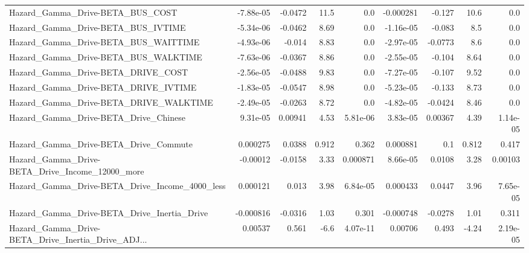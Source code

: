 \begin{tabular}{lrrrrrrrr}
Hazard\_Gamma\_Drive-BETA\_BUS\_COST                   &   -7.88e-05 &      -0.0472 &     11.5 &      0.0 &  -0.000281 &      -0.127 &         10.6 &           0.0 \\
Hazard\_Gamma\_Drive-BETA\_BUS\_IVTIME                 &   -5.34e-06 &      -0.0462 &     8.69 &      0.0 &  -1.16e-05 &      -0.083 &          8.5 &           0.0 \\
Hazard\_Gamma\_Drive-BETA\_BUS\_WAITTIME               &   -4.93e-06 &       -0.014 &     8.83 &      0.0 &  -2.97e-05 &     -0.0773 &          8.6 &           0.0 \\
Hazard\_Gamma\_Drive-BETA\_BUS\_WALKTIME               &   -7.63e-06 &      -0.0367 &     8.86 &      0.0 &  -2.55e-05 &      -0.104 &         8.64 &           0.0 \\
Hazard\_Gamma\_Drive-BETA\_DRIVE\_COST                 &   -2.56e-05 &      -0.0488 &     9.83 &      0.0 &  -7.27e-05 &      -0.107 &         9.52 &           0.0 \\
Hazard\_Gamma\_Drive-BETA\_DRIVE\_IVTIME               &   -1.83e-05 &      -0.0547 &     8.98 &      0.0 &  -5.23e-05 &      -0.133 &         8.73 &           0.0 \\
Hazard\_Gamma\_Drive-BETA\_DRIVE\_WALKTIME             &   -2.49e-05 &      -0.0263 &     8.72 &      0.0 &  -4.82e-05 &     -0.0424 &         8.46 &           0.0 \\
Hazard\_Gamma\_Drive-BETA\_Drive\_Chinese              &    9.31e-05 &      0.00941 &     4.53 & 5.81e-06 &   3.83e-05 &     0.00367 &         4.39 &      1.14e-05 \\
Hazard\_Gamma\_Drive-BETA\_Drive\_Commute              &    0.000275 &       0.0388 &    0.912 &    0.362 &   0.000881 &         0.1 &        0.812 &         0.417 \\
Hazard\_Gamma\_Drive-BETA\_Drive\_Income\_12000\_more    &    -0.00012 &      -0.0158 &     3.33 & 0.000871 &   8.66e-05 &      0.0108 &         3.28 &       0.00103 \\
Hazard\_Gamma\_Drive-BETA\_Drive\_Income\_4000\_less     &    0.000121 &        0.013 &     3.98 & 6.84e-05 &   0.000433 &      0.0447 &         3.96 &      7.65e-05 \\
Hazard\_Gamma\_Drive-BETA\_Drive\_Inertia\_Drive        &   -0.000816 &      -0.0316 &     1.03 &    0.301 &  -0.000748 &     -0.0278 &         1.01 &         0.311 \\
Hazard\_Gamma\_Drive-BETA\_Drive\_Inertia\_Drive\_ADJ... &     0.00537 &        0.561 &     -6.6 & 4.07e-11 &    0.00706 &       0.493 &        -4.24 &      2.19e-05 \\

\end{tabular}
